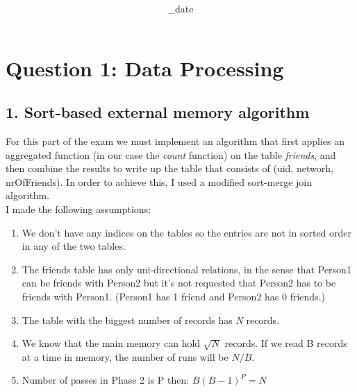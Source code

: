 \documentclass{article}      %
\title{\Course\\\Exam}
\author{\Studentname}
\date{\Sub_date}      %
\begin{document}

\maketitle                   %


\section*{Question 1: Data Processing} 

\subsection* {1. Sort-based external memory algorithm}

For this part of the exam we must implement an algorithm that first applies an aggregated function (in our case the \emph{count} function) on the table \emph{friends}, and then combine the results to write up the table that consists of (uid, networh, nrOfFriends). In order to achieve this, I used a modified sort-merge join algorithm.\\

I made the following assumptions:
\begin{enumerate}
\item
We don't have any indices on the tables so the entries are not in sorted order in any of the two tables.
\item  
The friends table has only uni-directional relations, in the sense that Person1 can be friends with Person2 but it's not requested that Person2 has to be friends with Person1. (Person1 has 1 friend and Person2 has 0 friends.)
\item
The table with the biggest number of records has \emph{N} records.
\item
We know that the main memory can hold \begin{math}\sqrt{N}\end{math} records. If we read B records at a time in memory, the number of runs will be \begin{math}N/B\end{math}.
\item 
Number of passes in Phase 2 is P then: \begin{math}B(B-1)^P = N\end{math}\\
 \end{enumerate}
\end{document}
